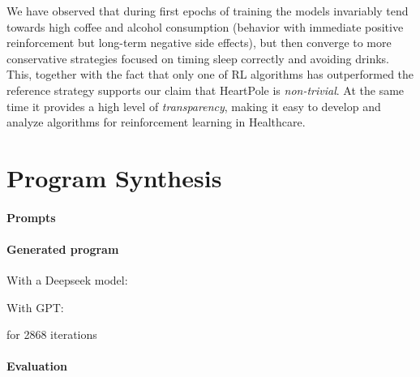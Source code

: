 We have observed that during first epochs of training the models invariably tend towards high coffee and alcohol consumption (behavior with immediate positive reinforcement but long-term negative side effects), but then converge to more conservative strategies focused on timing sleep correctly and avoiding drinks. 
This, together with the fact that only one of RL algorithms has outperformed the reference strategy supports our claim that HeartPole is \emph{non-trivial}.
At the same time it provides a high level of \emph{transparency}, making it easy to develop and analyze algorithms for reinforcement learning in Healthcare.

\newpage
\section{Program Synthesis}

\paragraph{Prompts}

\paragraph{Generated program}

With a Deepseek model:



With GPT:



for 2868 iterations

\paragraph{Evaluation}

